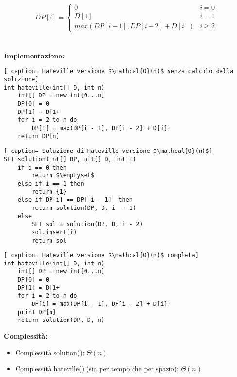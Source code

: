 \documentclass[../cheatSheetAlgoritmi.tex]{subfiles}
\begin{document}
\begin{equation*}
  	DP[i] =\begin{cases}
    	0 & \text{$i = 0$}\\
    	D[1] & \text{$i = 1$}\\
    	max(DP[i -1], DP[i-2]+D[i]) & \text{$i \ge 2$}
  	\end{cases}
\end{equation*} \\\\
\textbf{Implementazione:}
\begin{lstlisting}[ caption= Hateville versione $\mathcal{O}(n)$ senza calcolo della soluzione]
int hateville(int[] D, int n)
	int[] DP = new int[0...n]
	DP[0] = 0
	DP[1] = D[1+
	for i = 2 to n do
		DP[i] = max(DP[i - 1], DP[i - 2] + D[i])
	return DP[n]
\end{lstlisting}

\begin{lstlisting}[ caption= Soluzione di Hateville versione $\mathcal{O}(n)$]
SET solution(int[] DP, nit[] D, int i)
	if i == 0 then
		return $\emptyset$
	else if i == 1 then
		return {1}
	else if DP[i] == DP[ i - 1]  then
		return solution(DP, D, i  - 1)
	else
		SET sol = solution(DP, D, i - 2)
		sol.insert(i)
		return sol
\end{lstlisting}

\begin{lstlisting}[ caption= Hateville versione $\mathcal{O}(n)$ completa]
int hateville(int[] D, int n)
	int[] DP = new int[0...n]
	DP[0] = 0
	DP[1] = D[1+
	for i = 2 to n do
		DP[i] = max(DP[i - 1], DP[i - 2] + D[i])
	print DP[n]
	return solution(DP, D, n)
\end{lstlisting}
\textbf{Complessità:}  
\begin{itemize}
	\item Complessità solution(): $\Theta(n)$
	\item Complessità hateville() (sia per tempo che per spazio): $\Theta(n)$
\end{itemize}
\end{document}
